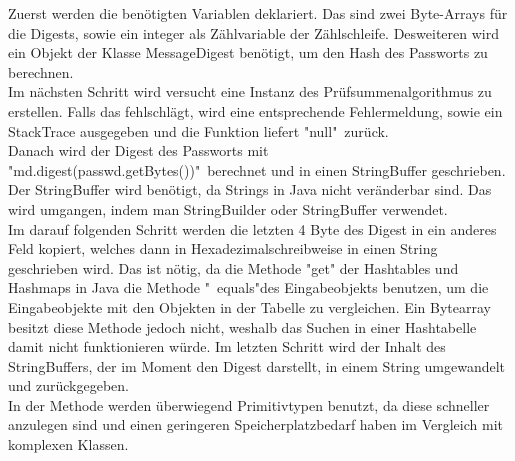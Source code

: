 \documentclass[11pt]{article}
\begin{document}
Zuerst werden die benötigten Variablen deklariert. Das sind zwei Byte-Arrays für die Digests, sowie ein integer als Zählvariable der Zählschleife. Desweiteren wird ein Objekt der Klasse MessageDigest benötigt, um den Hash des Passworts zu berechnen. \\
Im nächsten Schritt wird versucht eine Instanz des Prüfsummenalgorithmus zu erstellen. Falls das fehlschlägt, wird eine entsprechende Fehlermeldung, sowie ein StackTrace ausgegeben und die Funktion liefert "null"\ zurück.\\
Danach wird der Digest des Passworts mit "md.digest(passwd.getBytes())"\ berechnet und in einen StringBuffer geschrieben. Der StringBuffer wird benötigt, da Strings in Java nicht veränderbar sind. Das wird umgangen, indem man StringBuilder oder StringBuffer verwendet. \\
Im darauf folgenden Schritt werden die letzten 4 Byte des Digest in ein anderes Feld kopiert, welches dann in Hexadezimalschreibweise in einen String geschrieben wird. Das ist nötig, da die Methode "get" der Hashtables und Hashmaps in Java die Methode "\ equals"des Eingabeobjekts benutzen, um die Eingabeobjekte mit den Objekten in der Tabelle zu vergleichen. Ein Bytearray besitzt diese Methode jedoch nicht, weshalb das Suchen in einer Hashtabelle damit nicht funktionieren würde.
Im letzten Schritt wird der Inhalt des StringBuffers, der im Moment den Digest darstellt, in einem String umgewandelt und zurückgegeben.\\
In der Methode werden überwiegend Primitivtypen benutzt, da diese schneller anzulegen sind und einen geringeren Speicherplatzbedarf haben im Vergleich mit komplexen Klassen.
\end{document}
